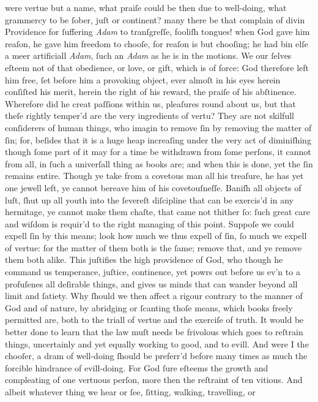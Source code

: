 were vertue but a name, what praiſe could be then due to well-doing, what
grammercy to be ſober, juſt or continent? many there be that complain of divin
Providence for ſuffering \textit{Adam} to tranſgreſſe, fooliſh tongues! when God
gave him reaſon, he gave him freedom to chooſe, for reaſon is but chooſing; he
had bin elſe a meer artificiall \textit{Adam}, ſuch an \textit{Adam} as he is in
the motions.  We our ſelves eſteem not of that obedience, or love, or gift,
which is of force: God therefore left him free, ſet before him a provoking
object, ever almoſt in his eyes herein conſiſted his merit, herein the right of
his reward, the praiſe of his abſtinence.  Wherefore did he creat paſſions
within us, pleaſures round about us, but that theſe rightly temper'd are the
very ingredients of vertu?  They are not skilfull conſiderers of human things,
who imagin to remove ſin by removing the matter of ſin; for, beſides that it is
a huge heap increaſing under the very act of diminiſhing though ſome part of it
may for a time be withdrawn from ſome perſons, it cannot from all, in ſuch a
univerſall thing as books are; and when this is done, yet the ſin remains
entire.  Though ye take from a covetous man all his treaſure, he has yet one
jewell left, ye cannot bereave him of his covetouſneſſe.  Baniſh all objects of
luſt, ſhut up all youth into the ſevereſt diſcipline that can be exercis'd in
any hermitage, ye cannot make them chaſte, that came not thither ſo: ſuch great
care and wiſdom is requir'd to the right managing of this point.  Suppoſe we
could expell ſin by this means; look how much we thus expell of ſin, ſo much we
expell of vertue: for the matter of them both is the ſame; remove that, and ye
remove them both alike.  This juſtifies the high providence of God, who though
he command us temperance, juſtice, continence, yet powrs out before us ev'n to a
profuſenes all deſirable things, and gives us minds that can wander beyond all
limit and ſatiety.  Why ſhould we then affect a rigour contrary to the manner of
God and of nature, by abridging or ſcanting thoſe means, which books freely
permitted are, both to the triall of vertue and the exerciſe of truth.  It would
be better done to learn that the law muſt needs be frivolous which goes to
reſtrain things, uncertainly and yet equally working to good, and to evill.  And
were I the chooſer, a dram of well-doing ſhould be preferr'd before many times
as much the forcible hindrance of evill-doing.  For God ſure eſteems the growth
and compleating of one vertuous perſon, more then the reſtraint of ten vitious.
And albeit whatever thing we hear or ſee, ſitting, walking, travelling, or

